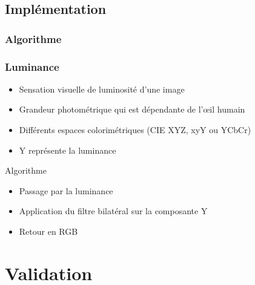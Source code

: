 \documentclass[compress]{beamer}
\begin{document}
\subsection{Implémentation}
\begin{frame}\frametitle{Algorithme}
\begin{algorithm}[H] 
	\DontPrintSemicolon
	\BlankLine
\end{algorithm}

\end{frame}

\begin{frame}\frametitle{Luminance}
	\begin{definition}
		\begin{itemize}
			\item Sensation visuelle de luminosité d'une image
			\item Grandeur photométrique qui est dépendante de l'\oe il humain
			\item Différents espaces colorimétriques (CIE XYZ, xyY ou YCbCr)
			\item Y représente la luminance
		\end{itemize}
	\end{definition}
\pause	
	\begin{block}{Algorithme}
		\begin{itemize}
			\item Passage par la luminance
			\item Application du filtre bilatéral sur la composante Y
			\item Retour en RGB
		\end{itemize}
	
	\end{block}
\end{frame}




\section{Validation}
\end{document}
